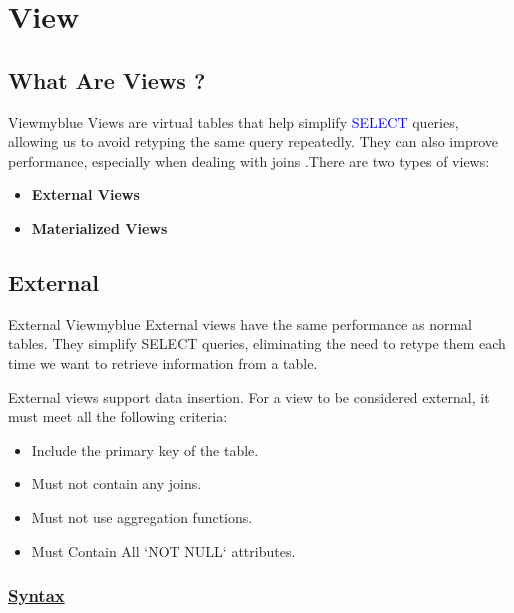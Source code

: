 \section{View}
\subsection{What Are Views ?}



\begin{prettyBox}{View}{myblue}
    Views are virtual tables that help simplify \textcolor{blue}{SELECT} queries, allowing us to avoid retyping the same query repeatedly. They can also improve performance, especially when dealing with joins .There are two types of views:  
\begin{itemize}
    \item \textbf{External Views} 
    \item \textbf{Materialized Views}
\end{itemize}
\end{prettyBox}




\subsection{External}


\begin{prettyBox}{External View}{myblue}
External views have the same performance as normal tables. They simplify SELECT queries, eliminating the need to retype them each time we want to retrieve information from a table. 

\vspace{0.15cm}
External views support data insertion. For a view to be considered external, it must meet all the following criteria:  
\begin{itemize}
    \item Include the primary key of the table.
    \item Must not contain any joins.
    \item Must not use aggregation functions.
    \item Must Contain All `NOT NULL` attributes.
\end{itemize}
\end{prettyBox}


\subsubsection*{\underline{Syntax}}

